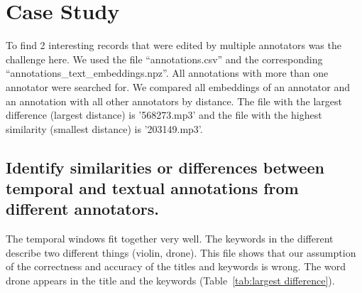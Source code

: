 
\section{Case Study}
\label{sec:Case Study}

To find 2 interesting records that were edited by multiple annotators was the challenge here. 
We used the file ``annotations.csv'' and the corresponding ``annotations\_text\_embeddings.npz''. 
All annotations with more than one annotator were searched for. 
We compared all embeddings of an annotator and an annotation with all other annotators by distance.
The file with the largest difference (largest distance) is '568273.mp3' and the file with the highest similarity (smallest distance) is '203149.mp3'.

\subsection{Identify similarities or differences between temporal and textual annotations from different annotators.}
\label{sec:Case Study:a}

The temporal windows fit together very well. The keywords in the different describe two different things (violin, drone).
This file shows that our assumption of the correctness and accuracy of the titles and keywords is wrong. 
The word drone appears in the title and the keywords (Table~\ref{tab:largest difference}).

